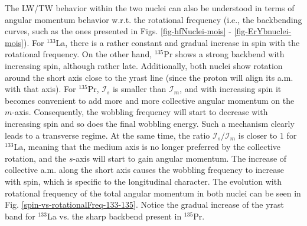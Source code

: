 The LW/TW behavior within the two nuclei can also be understood in terms of angular momentum behavior w.r.t. the rotational frequency (i.e., the backbending curves, such as the ones presented in Figs. \ref{fig-hfNuclei-mois} - \ref{fig-ErYbnuclei-mois}). For $^{133}$La, there is a rather constant and gradual increase in spin with the rotational frequency. On the other hand, $^{135}$Pr shows a strong backbend with increasing spin, although rather late. Additionally, both nuclei show rotation around the short axis close to the yrast line (since the proton will align its a.m. with that axis). For $^{135}$Pr, $\mathcal{I}_s$ is smaller than $\mathcal{I}_m$, and with increasing spin it becomes convenient to add more and more collective angular momentum on the $m$-axis. Consequently, the wobbling frequency will start to decrease with increasing spin and so does the final wobbling energy. Such a mechanism clearly leads to a transverse regime. At the same time, the ratio $\mathcal{I}_s/\mathcal{I}_m$ is closer to $1$ for $^{133}$La, meaning that the medium axis is no longer preferred by the collective rotation, and the $s$-axis will start to gain angular momentum. The increase of collective a.m. along the short axis causes the wobbling frequency to increase with spin, which is specific to the longitudinal character. The evolution with rotational frequency of the total angular momentum in both nuclei can be seen in Fig. \ref{spin-vs-rotationalFreq-133-135}. Notice the gradual increase of the yrast band for $^{133}$La vs. the sharp backbend present in $^{135}$Pr.
